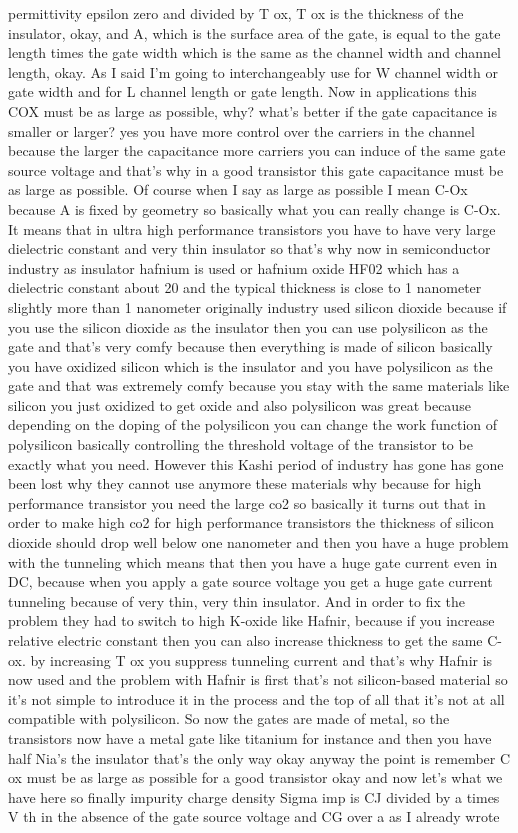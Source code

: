 permittivity epsilon zero and divided by T ox, T ox is the thickness of the insulator, okay, and A, which is the surface area of the gate, is equal to the gate length times the gate width which is the same as the channel width and channel length, okay. As I said I'm going to interchangeably use for W channel width or gate width and for L channel length or gate length. Now in applications this COX must be as large as possible, why? what's better if the gate capacitance is smaller or larger? yes you have more control over the carriers in the channel because the larger the capacitance more carriers you can induce of the same gate source voltage and that's why in a good transistor this gate capacitance must be as large as possible. Of course when I say as large as possible I mean C-Ox because A is fixed by geometry so basically what you can really change is C-Ox. It means that in ultra high performance transistors you have to have very large dielectric constant and very thin insulator so that's why now in semiconductor industry as insulator hafnium is used or hafnium oxide HF02 which has a dielectric constant about 20 and the typical thickness is close to 1 nanometer slightly more than 1 nanometer originally industry used silicon dioxide because if you use the silicon dioxide as the insulator then you can use polysilicon as the gate and that's very comfy because then everything is made of silicon basically you have oxidized silicon which is the insulator and you have polysilicon as the gate and that was extremely comfy because you stay with the same materials like silicon you just oxidized to get oxide and also polysilicon was great because depending on the doping of the polysilicon you can change the work function of polysilicon basically controlling the threshold voltage of the transistor to be exactly what you need. However this Kashi period of industry has gone has gone been lost why they cannot use anymore these materials why because for high performance transistor you need the large co2 so basically it turns out that in order to make high co2 for high performance transistors the thickness of silicon dioxide should drop well below one nanometer and then you have a huge problem with the tunneling which means that then you have a huge gate current even in DC, because when you apply a gate source voltage you get a huge gate current tunneling because of very thin, very thin insulator. And in order to fix the problem they had to switch to high K-oxide like Hafnir, because if you increase relative electric constant then you can also increase thickness to get the same C-ox. by increasing T ox you suppress tunneling current and that's why Hafnir is now used and the problem with Hafnir is first that's not silicon-based material so it's not simple to introduce it in the process and the top of all that it's not at all compatible with polysilicon. So now the gates are made of metal, so the transistors now have a metal gate like titanium for instance and then you have half Nia's the insulator that's the only way okay anyway the point is remember C ox must be as large as possible for a good transistor okay and now let's what we have here so finally impurity charge density Sigma imp is CJ divided by a times V th in the absence of the gate source voltage and CG over a as I already wrote 